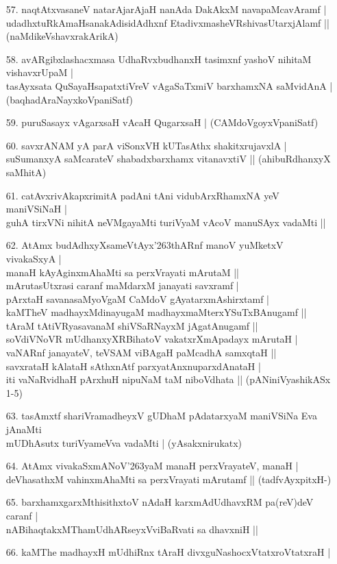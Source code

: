 \begin{itemize}
\item[57.] naqtAtxvasaneV natarAjarAjaH nanAda DakAkxM navapaMcavAramf |\\\label{152}
udadhxtuRkAmaHsanakAdisidAdhxnf EtadivxmasheVRshivasUtarxjAlamf ||
\hfill{(naMdikeVshavxrakArikA)}
\item[58.] avARgibxlashacxmasa UdhaRvxbudhanxH tasimxnf yashoV nihitaM vishavxrUpaM |\\\label{152}
tasAyxsata QuSayaHsapatxtiVreV vAgaSaTxmiV barxhamxNA saMvidAnA |
\hfill{(baqhadAraNayxkoVpaniSatf)}
\item[59.] puruSasayx vAgarxsaH vAcaH QugarxsaH |\label{152}
\hfill{(CAMdoVgoyxVpaniSatf)}
\item[60.] savxrANAM yA parA viSonxVH kUTasAthx shakitxrujavxlA |\\\label{152}
suSumanxyA saMcarateV shabadxbarxhamx vitanavxtiV ||
\hfill{(ahibuRdhanxyX saMhitA)}
\item[61.] catAvxrivAkapxrimitA padAni tAni vidubArxRhamxNA yeV maniVSiNaH |\\\label{152}
guhA tirxVNi nihitA neVMgayaMti turiVyaM vAcoV manuSAyx vadaMti ||
\item[62.] AtAmx budAdhxyXsameVtAyx\char'263thARnf manoV yuMketxV vivakaSxyA |\\\label{152}
manaH kAyAginxmAhaMti sa perxVrayati mArutaM ||\\
mArutasUtxrasi caranf maMdarxM janayati savxramf |\\
pArxtaH savanasaMyoVgaM CaMdoV gAyatarxmAshirxtamf |\\
kaMTheV madhayxMdinayugaM madhayxmaMterxYSuTxBAnugamf ||\\
tAraM tAtiVRyasavanaM shiVSaRNayxM jAgatAnugamf ||\\
soVdiVNoVR mUdhanxyXRBihatoV vakatxrXmApadayx mArutaH |\\
vaNARnf janayateV, teVSAM viBAgaH paMcadhA samxqtaH ||\\
savxrataH kAlataH sAthxnAtf parxyatAnxnuparxdAnataH |\\
iti vaNaRvidhaH pArxhuH nipuNaM taM niboVdhata ||
\hfill{(pANiniVyashikASx 1-5)}
\item[63.] tasAmxtf shariVramadheyxV gUDhaM pAdatarxyaM maniVSiNa Eva jAnaMti \\\label{153}
mUDhAsutx turiVyameVva vadaMti |
\hfill{(yAsakxnirukatx)}
\item[64.] AtAmx vivakaSxmANoV\char'263yaM manaH perxVrayateV, manaH |\\\label{153}
deVhasathxM vahinxmAhaMti sa perxVrayati mArutamf ||
\hfill{(tadfvAyxpitxH-)}
\item[65.] barxhamxgarxMthisithxtoV nAdaH karxmAdUdhavxRM pa(reV)deV caranf |\\
nABihaqtakxMThamUdhARseyxVviBaRvati sa dhavxniH ||
\item[66.] kaMThe madhayxH mUdhiRnx tAraH divxguNashocxVtatxroVtatxraH |\label{153}
\end{itemize}

